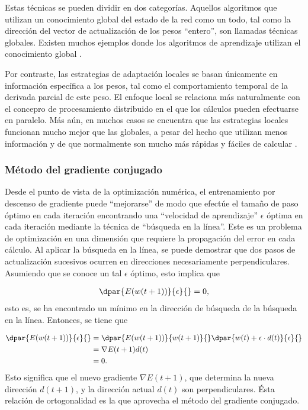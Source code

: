 Estas técnicas se pueden dividir en dos
categorías. Aquellos algoritmos que utilizan un conocimiento global
del estado de la red como un todo, tal como la dirección del vector de
actualización de los pesos ``entero'', son llamadas técnicas globales.
Existen muchos ejemplos donde los algoritmos de aprendizaje utilizan el
conocimiento global \cite{salomon, moeller}.

Por contraste, las estrategias de adaptación locales se basan
únicamente en información específica a los pesos, tal como el
comportamiento temporal de la derivada parcial de este peso. El
enfoque local se relaciona más naturalmente con el concepro de
procesamiento distribuido en el que los cálculos pueden efectuarse en
paralelo.  Más aún, en muchos casos se encuentra que las estrategias
locales funcionan mucho mejor que las globales, a pesar del hecho que
utilizan menos información y de que normalmente son mucho más rápidas
y fáciles de calcular \cite{schiffmann}.

\subsubsection{Método del gradiente conjugado}
Desde el punto de vista de la optimización numérica, el entrenamiento
por descenso de gradiente puede ``mejorarse'' de modo que efectúe el
tamaño de paso óptimo en cada iteración encontrando una ``velocidad de
aprendizaje'' $\epsilon$ óptima en cada iteración mediante la técnica
de ``búsqueda en la línea''. Este es un problema de optimización en
una dimensión que requiere la propagación del error en cada cálculo.
Al aplicar la búsqueda en la línea, se puede demostrar que dos pasos
de actualización sucesivos ocurren en direcciones necesariamente
perpendiculares. Asumiendo que se conoce un tal $\epsilon$ óptimo,
esto implica que

\begin{align*}
  \dpar{E(w(t+1))}{\epsilon}{}=0,
\end{align*}
esto es, se ha encontrado un mínimo en la dirección
de búsqueda de la búsqueda en la línea. Entonces, se tiene que

\begin{align}
\label{mlp9}
  \dpar{E(w(t+1))}{\epsilon}{} &= \dpar{E(w(t+1))}{w(t+1)}{}
    \dpar{w(t)+\epsilon\cdot d(t)}{\epsilon}{} \notag\\
  &= \nabla E(t+1) d(t) \notag\\
  &=0.
\end{align}
Esto significa que el nuevo gradiente $\nabla{}E(t+1)$, que determina
la nueva dirección $d(t+1)$, y la dirección actual $d(t)$ son
perpendiculares.  Ésta relación de ortogonalidad es la que aprovecha
el método del gradiente conjugado.

